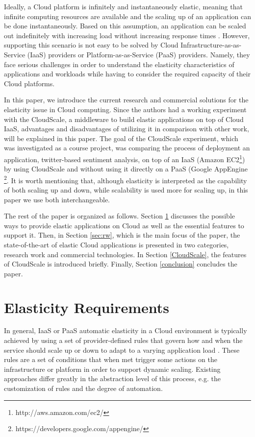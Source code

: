 \documentclass{sig-alternate}
\begin{document}
Ideally, a Cloud platform is infinitely and instantaneously elastic, meaning that infinite computing resources are available and the scaling up of an application can be done instantaneously. Based on this assumption, an application can be scaled out indefinitely with increasing load without increasing response times \cite{brebner2012your}. However, supporting this scenario is not easy to be solved by Cloud Infrastructure-as-as-Service (IaaS) providers or Platform-as-as-Service (PaaS) providers. Namely, they face serious challenges in order to understand the elasticity characteristics of applications and workloads while having to consider the required capacity of their Cloud platforms.

In this paper, we introduce the current research and commercial solutions for the elasticity issue in Cloud computing. Since the authors had a working experiment with the CloudScale, a middleware to build elastic applications on top of Cloud IaaS, advantages and disadvantages of utilizing it in comparison with other work, will be explained in this paper. The goal of the CloudScale experiment, which was investigated as a course project, was comparing the process of deployment an application, twitter-based sentiment analysis, on top of an IaaS (Amazon EC2\footnote{http://aws.amazon.com/ec2/}) by using CloudScale and without using it directly on a PaaS (Google AppEngine \footnote{https://developers.google.com/appengine/}. It is worth mentioning that, although elasticity is interpreted as the capability of both scaling up and down, while scalability is used more for scaling up, in this paper we use both interchangeable.

The rest of the paper is organized as follows. Section \ref{elasticity-req} discusses the possible ways to provide elastic applications on Cloud as well as the essential features to support it. Then, in Section \ref{sec:rw}, which is the main focus of the paper, the state-of-the-art of elastic Cloud applications is presented in two categories, research work and commercial technologies. In Section \ref{CloudScale}, the features of CloudScale is introduced briefly. Finally, Section \ref{conclusion} concludes the paper.

\section{Elasticity Requirements} \label{elasticity-req}
In general, IaaS or PaaS automatic elasticity in a Cloud environment is typically achieved by using a set of provider-defined rules that govern how and when the service should scale up or down to adapt to a varying application load \cite{vaquero2011dynamically}. These rules are a set of conditions that when met trigger some actions on the infrastructure or platform in order to support dynamic scaling. Existing approaches differ greatly in the abstraction level of this process, e.g. the customization of rules and the degree of automation.
\end{document}

